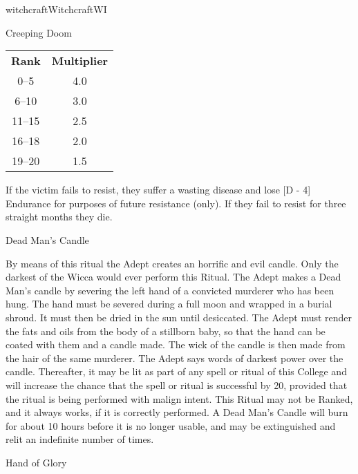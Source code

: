 \begin{college}[1.1]{witchcraft}{Witchcraft}{WI}
\begin{ritual}[R-2]{Creeping Doom}
\begin{effects}
\begin{tabular}{cc}
\textbf{Rank} & \textbf{Multiplier} \\
0--5	& 4.0 \\
6--10	& 3.0 \\
11--15	& 2.5 \\
16--18	& 2.0 \\
19--20	& 1.5 \\
\end{tabular}

If the victim fails to resist, they suffer a wasting disease and lose
[D - 4] Endurance for purposes of future resistance (only).  If they
fail to resist for three straight months they die.
\end{effects}
\end{ritual}

\begin{ritual}[R-3]{Dead Man's Candle}

\begin{effects}
By means of this ritual the Adept creates an horrific and evil candle.
Only the darkest of the Wicca would ever perform this Ritual.  The
Adept makes a Dead Man's candle by severing the left hand of a
convicted murderer who has been hung.  The hand must be severed during
a full moon and wrapped in a burial shroud.  It must then be dried in
the sun until desiccated.  The Adept must render the fats and oils
from the body of a stillborn baby, so that the hand can be coated with
them and a candle made.  The wick of the candle is then made from the
hair of the same murderer.  The Adept says words of darkest power over
the candle.  Thereafter, it may be lit as part of any spell or ritual
of this College and will increase the chance that the spell or ritual
is successful by 20, provided that the ritual is being performed with
malign intent.  This Ritual may not be Ranked, and it always works, if
it is correctly performed.  A Dead Man's Candle will burn for about 10
hours before it is no longer usable, and may be extinguished and relit
an indefinite number of times.
\end{effects}
\end{ritual}

\begin{ritual}[R-4]{Hand of Glory}


\end{ritual}
\end{college}
